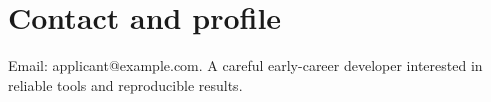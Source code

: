 \section{Contact and profile}
Email: applicant@example.com. A careful early-career developer interested in reliable tools and reproducible results.

